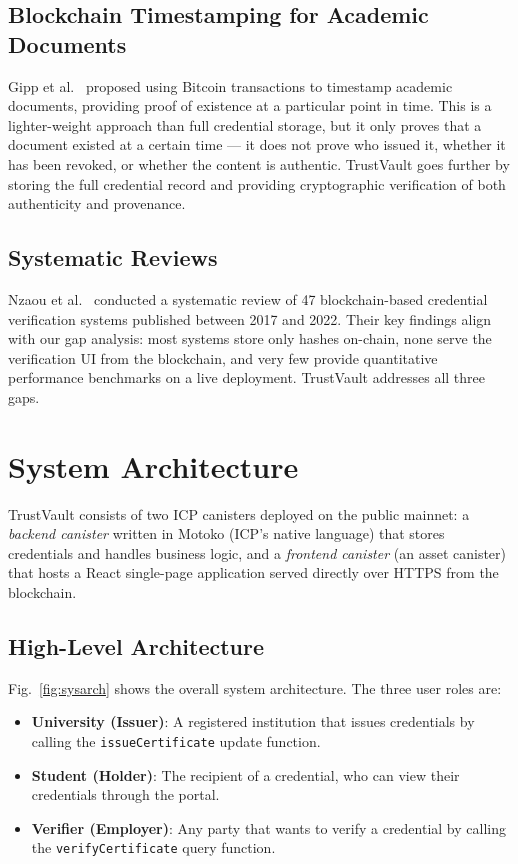 \documentclass[conference]{IEEEtran}
\begin{document}
\subsection{Blockchain Timestamping for Academic Documents}

Gipp et al.~\cite{gipp2015decentralized} proposed using Bitcoin transactions to timestamp academic documents, providing proof of existence at a particular point in time. This is a lighter-weight approach than full credential storage, but it only proves that a document existed at a certain time — it does not prove who issued it, whether it has been revoked, or whether the content is authentic. TrustVault goes further by storing the full credential record and providing cryptographic verification of both authenticity and provenance.

\subsection{Systematic Reviews}

Nzaou et al.~\cite{nzaou2022credential} conducted a systematic review of 47 blockchain-based credential verification systems published between 2017 and 2022. Their key findings align with our gap analysis: most systems store only hashes on-chain, none serve the verification UI from the blockchain, and very few provide quantitative performance benchmarks on a live deployment. TrustVault addresses all three gaps.

\section{System Architecture}
\label{sec:architecture}

TrustVault consists of two ICP canisters deployed on the public mainnet: a \emph{backend canister} written in Motoko (ICP's native language) that stores credentials and handles business logic, and a \emph{frontend canister} (an asset canister) that hosts a React single-page application served directly over HTTPS from the blockchain.

\subsection{High-Level Architecture}

Fig.~\ref{fig:sysarch} shows the overall system architecture. The three user roles are:

\begin{itemize}[leftmargin=*]
  \item \textbf{University (Issuer)}: A registered institution that issues credentials by calling the \texttt{issueCertificate} update function.
  \item \textbf{Student (Holder)}: The recipient of a credential, who can view their credentials through the portal.
  \item \textbf{Verifier (Employer)}: Any party that wants to verify a credential by calling the \texttt{verifyCertificate} query function.
\end{itemize}
\end{document}
